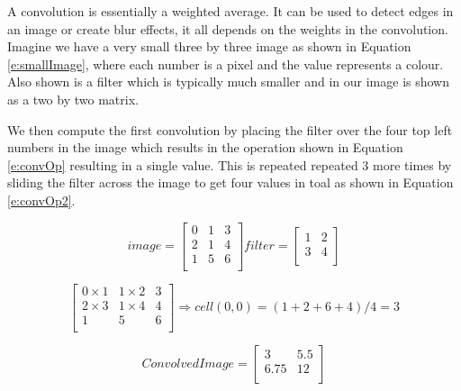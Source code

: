 \documentclass{bhamthesis}
\theoremstyle{definition}
\begin{document}
A convolution is essentially a weighted average. It can be used to detect edges in an image or create blur effects, it all depends on the weights in the convolution. Imagine we have a very small three by three image as shown in Equation \ref{e:smallImage}, where each number is a pixel and the value represents a colour. Also shown is a filter which is typically much smaller and in our image is shown as a two by two matrix.

We then compute the first convolution by placing the filter over the four top left numbers in the image which results in the operation shown in Equation \ref{e:convOp} resulting in a single value. This is repeated repeated 3 more times by sliding the filter across the image to get four values in toal as shown in Equation \ref{e:convOp2}.

\begin{equation}\label{e:smallImage}
image = 
\left[ \begin{array}{ccc}
0 & 1 & 3 \\
2 & 1 & 4 \\
1 & 5 & 6 \\
\end{array}\right]
filter = 
\left[\begin{array}{cc}
1 & 2 \\
3 & 4 \\
\end{array}\right]
\end{equation}

\begin{equation}\label{e:convOp}
\left[\begin{array}{ccc}
0 \times 1 & 1 \times 2 & 3 \\
2 \times3 & 1 \times 4 & 4 \\
1 & 5 & 6 \\
\end{array}\right]
\Rightarrow
cell(0,0) = (1+2+6+4)/4 = 3
\end{equation}

\begin{equation}\label{e:convOp2}
Convolved Image=
\left[\begin{array}{cc}
3 & 5.5 \\
6.75 & 12 \\
\end{array}\right]
\end{equation}
\end{document}
